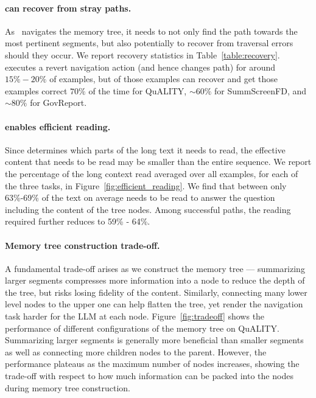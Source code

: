 \paragraph{\sysname{} can recover from stray paths.}
As \sysname{}~navigates the memory tree, it needs to not only find the path towards the most pertinent segments, but also potentially to recover from traversal errors should they occur. We report recovery statistics in  Table~\ref{table:recovery}.  
\sysname{} executes a revert navigation action (and hence changes path) for around $15\%-20\%$ of examples, but of those examples can recover and get those examples correct $70\%$ of the time for QuALITY, $\sim60\%$ for SummScreenFD, and $\sim80\%$ for GovReport.

\paragraph{\sysname{} enables efficient reading.}
Since \sysname{} determines which parts of the long text it needs to read, the effective content that needs to be read may be  smaller than the entire sequence. We report the percentage of the long context read  averaged over all examples, for each of the three tasks, in Figure~\ref{fig:efficient_reading}. We find that between only 63\%-69\%  of the text on average needs to be read to answer the question including the content of the tree nodes. Among successful paths, the reading required further reduces to 59\% - 64\%.

\paragraph{Memory tree construction trade-off.}
A fundamental trade-off arises as we construct the memory tree --- summarizing larger segments compresses more information into a node to reduce the depth of the tree, but risks losing fidelity of the content. Similarly, connecting many lower level nodes to the upper one can help flatten the tree, yet render the navigation task harder for the LLM at each node.
Figure~\ref{fig:tradeoff} shows  the performance of different configurations of the memory tree on QuALITY. Summarizing larger segments is generally more beneficial than smaller segments as well as connecting more children nodes to the parent. However, the performance plateaus as the maximum number of nodes increases, showing the trade-off with respect to how much information can be packed into the nodes during memory tree construction. 

